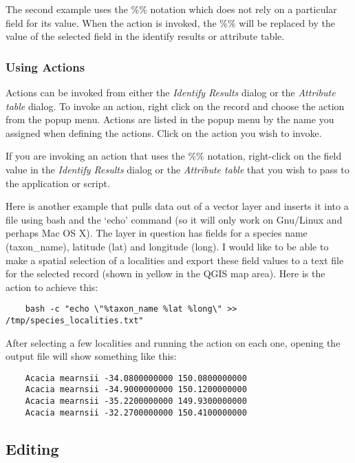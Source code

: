 The second example uses the \%\% notation which does not rely on a particular
field for its value. When the action is invoked, the \%\% will be replaced by
the value of the selected field in the identify results or attribute table.

\subsubsection{Using Actions}\label{label_usingactions}

Actions can be invoked from either the \textit{Identify Results} dialog or the
\textit{Attribute table} dialog. To invoke an action, right click on the
record
and choose the action from the popup menu. Actions are listed in the popup
menu
by the name you assigned when defining the actions. Click on the action you
wish
to invoke.

If you are invoking an action that uses the \%\% notation, right-click on the
field value in the \textit{Identify Results} dialog or the
\textit{Attribute table} that you wish to pass to the application or script.

Here is another example that pulls data out of a vector layer and inserts it
into a file using bash and the `echo' command (so it will only work on
Gnu/Linux
and perhaps Mac OS X). The layer in question has fields for a species name
(taxon\_name), latitude (lat) and longitude (long). I would like to be able to
make a spatial selection of a localities and export these field values to a
text
file for the selected record (shown in yellow in the QGIS map area). Here is
the
action to achieve this:

\begin{verbatim}
	bash -c "echo \"%taxon_name %lat %long\" >>
/tmp/species_localities.txt"
\end{verbatim} 

After selecting a few localities and running the action on each one, opening
the output file will show something like this:

\begin{verbatim}
	Acacia mearnsii -34.0800000000 150.0800000000
	Acacia mearnsii -34.9000000000 150.1200000000
	Acacia mearnsii -35.2200000000 149.9300000000
	Acacia mearnsii -32.2700000000 150.4100000000
\end{verbatim} 


\subsection{Editing}

